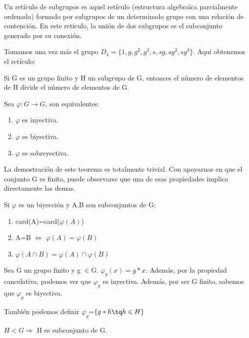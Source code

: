 \documentclass[a4paper,10pt]{apuntes}
\begin{document}
  \begin{defn}
   Un retículo de subgrupos es aquel retículo (estructura algebraica parcialmente ordenada) formado por subgrupos de un determinado grupo
   con una relación de contención. En este retículo, la unión de dos subgrupos es el subconjunto generado por su conexión.
  \end{defn}

  \begin{example}
   Tomamos una vez más el grupo $D_{4}=\{1,g,g^{2}, g^{3}, s, sg, sg^{2}, sg^{3}\}$. Aquí obtenemos el retículo:
  \end{example}

  \begin{theorem}
   Si G es un grupo finito y H un subgrupo de G, entonces el número de elementos de H divide el número de elementos de G.
  \end{theorem}
  \begin{lemma}
   Sea $\varphi: G\rightarrow G$, son equivalentes:
   \begin{enumerate}
    \item $\varphi$  es inyectiva.
    \item $\varphi$  es biyectiva.
    \item $\varphi$  es sobreyectiva.
   \end{enumerate}
  \end{lemma}
  La demostración de este teorema es totalmente trivial. Con apoyarnos en que el conjunto G es finito, puede observarse que una de
  esas propiedades implica directamente las demas.
  
  \begin{lemma}
   Si $\varphi$  es un biyección y A,B son subconjuntos de G:
   \begin{enumerate}
    \item card(A)=card($\varphi(A)$)
    \item A=B $\Leftrightarrow$  $\varphi(A)=\varphi(B)$
    \item $\varphi(A\cap B)=\varphi(A)\cap\varphi(B)$
   \end{enumerate}
  \end{lemma}
  
  \begin{lemma}
   Sea G un grupo finito y g $\in$G. $\varphi_{g}(x)=g\ast x$. Además, por la propiedad cancelativa, podemos ver que $\varphi_{g}$ es inyectiva.
   Además, por ser G finito, sabemos que $\varphi_{g}$  es biyectiva.
  \end{lemma}
  También podemos definir $\varphi_{g}$=$\{g\ast h\tq h\in H\}$
  \begin{lemma}
   $H<G\Rightarrow$  H es subconjunto de G.
  \end{lemma}
  
\end{document}
